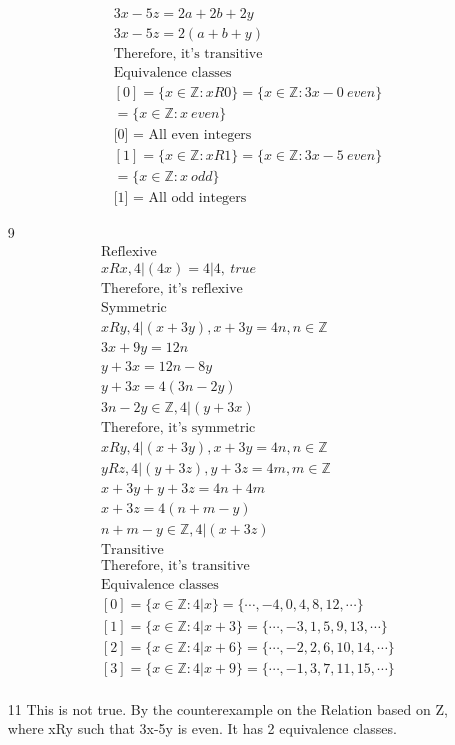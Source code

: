 \documentclass[12pt]{article}
\begin{document}
\begin{enumerate}
\begin{equation*}
\begin{split}
		    3x - 5z = 2a + 2b + 2y\\
		    3x - 5z = 2(a + b + y)\\
		    \text{Therefore, it's transitive}\\
		    \text{Equivalence classes}\\
		    [0] = \{x \in \mathbb{Z}: xR0\} = \{x\in \mathbb{Z}: 3x-0\ even\}\\
		    = \{x\in \mathbb{Z}:x\ even\}\\
		    \text{[0] = All even integers}\\
		    [1] = \{x \in \mathbb{Z}: xR1\} = \{x\in \mathbb{Z}: 3x-5\ even\}\\
		    = \{x\in \mathbb{Z}:x\ odd\}\\
		    \text{[1] = All odd integers}
		\end{split}
	    \end{equation*}
	\item [9]
	    \begin{equation*}
	    	\begin{split}
		    \text{Reflexive}\\
		    xRx, 4|(4x) = 4|4,\ true\\
		    \text{Therefore, it's reflexive}\\
		    \text{Symmetric}\\
		    xRy, 4|(x + 3y), x + 3y = 4n, n\in \mathbb{Z}\\
		    3x + 9y = 12n\\
		    y+3x = 12n - 8y\\
		    y+3x = 4(3n - 2y)\\
		    3n-2y \in \mathbb{Z}, 4|(y+3x)\\
		    \text{Therefore, it's symmetric}\\
		    xRy, 4|(x + 3y), x + 3y = 4n, n\in \mathbb{Z}\\
		    yRz, 4|(y + 3z), y + 3z = 4m, m\in \mathbb{Z}\\
		    x+3y+y+3z = 4n+4m\\
		    x+3z = 4(n+m-y)\\
		    n+m-y \in \mathbb{Z}, 4|(x+3z)\\
		    \text{Transitive}\\
		    \text{Therefore, it's transitive}\\
		    \text{Equivalence classes}\\
		    [0] = \{x \in \mathbb{Z}: 4|x\} = \{\cdots, -4, 0, 4, 8, 12, \cdots\}\\
		    [1] = \{x \in \mathbb{Z}: 4|x+3\} = \{\cdots, -3, 1, 5, 9, 13, \cdots\}\\
		    [2] = \{x \in \mathbb{Z}: 4|x+6\} = \{\cdots, -2, 2, 6, 10, 14, \cdots\}\\
		    [3] = \{x \in \mathbb{Z}: 4|x+9\} = \{\cdots, -1, 3, 7, 11, 15, \cdots\}\\
	    	\end{split}
	    \end{equation*}
	\item [11] This is not true. By the counterexample on the Relation based on Z, where xRy such that 3x-5y is even. It has 2 equivalence classes.
\end{enumerate}
\end{document}
